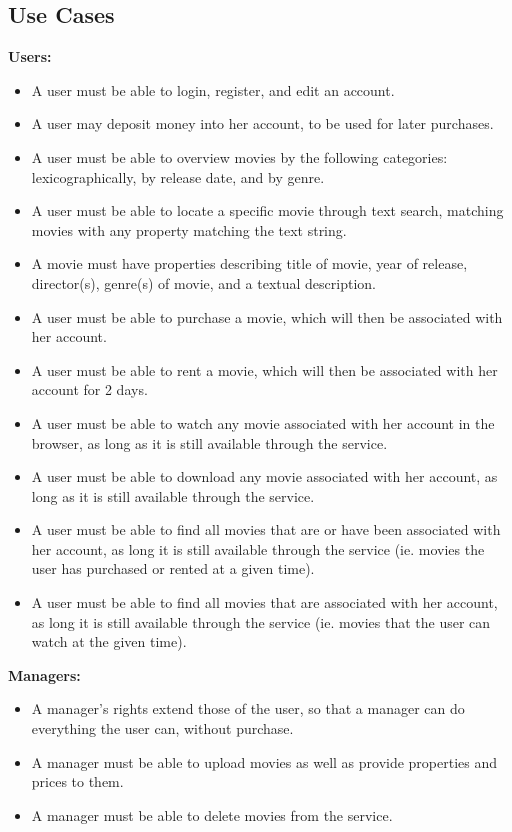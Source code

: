 \subsection{Use Cases}
\label{app:usecases}
\textbf{Users:}
\begin{itemize}
\item A user must be able to login, register, and edit an account.
\item A user may deposit money into her account, to be used for later purchases.
\item A user must be able to overview movies by the following categories: lexicographically, by release date, and by genre.
\item A user must be able to locate a specific movie through text search, matching movies with any property matching the text string.
\item A movie must have properties describing title of movie, year of release, director(s), genre(s) of movie, and a textual description.
\item A user must be able to purchase a movie, which will then be associated with her account.
\item A user must be able to rent a movie, which will then be associated with her account for 2 days.
\item A user must be able to watch any movie associated with her account in the browser, as long as it is still available through the service.
\item A user must be able to download any movie associated with her account, as long as it is still available through the service.
\item A user must be able to find all movies that are or have been associated with her account, as long it is still available through the service (ie. movies the user has purchased or rented at a given time).
\item A user must be able to find all movies that are associated with her account, as long it is still available through the service (ie. movies that the user can watch at the given time).
\end{itemize}
\textbf{Managers:}
\begin{itemize}
\item A manager's rights extend those of the user, so that a manager can do everything the user can, without purchase.
\item A manager must be able to upload movies as well as provide properties and prices to them.
\item A manager must be able to delete movies from the service.
\end{itemize}